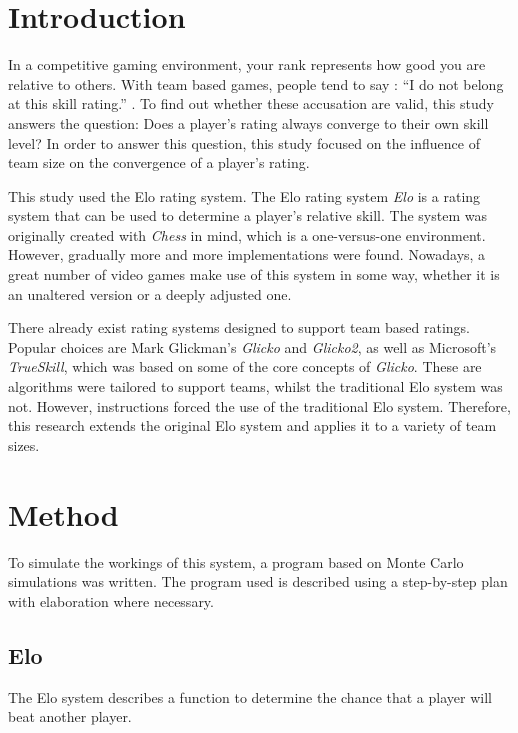 \documentclass[12pt]{article}
\begin{document}
\section{Introduction}

In a competitive gaming environment, your rank represents how good you are relative to others. With team based games, people tend to say :  ``I do not belong at this skill rating.'' \cite{exampleclaim}. To find out whether these accusation are valid, this study answers the question: Does a player's rating always converge to their own skill level? In order to answer this question, this study focused on the influence of team size on the convergence of a player's rating.

This study used the Elo rating system. The Elo rating system \textit{Elo}\cite{elo} is a rating system that can be used to determine a player's relative skill. The system was originally created with \textit{Chess} in mind, which is a one-versus-one environment. However, gradually more and more implementations were found. Nowadays, a great number of video games make use of this system in some way, whether it is an unaltered version or a deeply adjusted one. 

There already exist rating systems designed to support team based ratings. Popular choices are Mark Glickman's \textit{Glicko} and \textit{Glicko2}\cite{glicko}, as well as Microsoft's \textit{TrueSkill}\texttrademark\cite{trueskill}, which was based on some of the core concepts of \textit{Glicko}. These are algorithms were tailored to support teams, whilst the traditional Elo system was not. However, instructions forced the use of the traditional Elo system. Therefore, this research extends the original Elo system and applies it to a variety of team sizes. \\

\section{Method}
To simulate the workings of this system, a program based on Monte Carlo simulations\cite{montecarlo} was written. The program used is described using a step-by-step plan with elaboration where necessary.

\subsection{Elo}

The Elo system describes a function to determine the chance that a player will beat another player.\\
\end{document}
